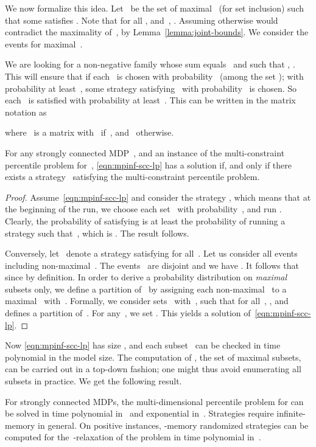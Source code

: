 \documentclass{llncs}
\begin{document}
We now formalize this idea. Let~ be the set of maximal~ (for set inclusion) such that some 
satisfies . 
Note that for all , and~,
. Assuming otherwise would contradict the maximality of~, by Lemma~\ref{lemma:joint-bounds}.
We consider the events 
for maximal~.

We are looking for a non-negative family 
 whose sum equals~ and such that , .
This will ensure that if each~ is chosen with probability~ (among the set ); with probability at least~,
some strategy satisfying~ with probability~ is chosen. So each~ is satisfied with probability at least~.
This can be written in the matrix notation as

where~ is a  matrix with~ if~, and~ otherwise.

\begin{lemma}
  For any strongly connected MDP~,
  and an instance  of the multi-constraint percentile problem for~,
  \eqref{eqn:mpinf-scc-lp} has a solution if, and only if there exists a strategy~ satisfying
  the multi-constraint percentile problem.
\end{lemma}

\begin{proof}
  Assume~\eqref{eqn:mpinf-scc-lp} and consider the strategy , which means that
  at the beginning of the run, we choose each set~ with probability~, and run
  . Clearly, the probability of satisfying  is at least the probability of running
  a strategy  such that~, which is .
  The result follows.

  Conversely, let~ denote a strategy satisfying  for all~.
  Let us consider all events~ including non-maximal~.
  The events~ are disjoint and we have .
  It follows that 
  since  by definition.
  In order to derive a probability distribution on \emph{maximal} subsets only, 
  we define a partition of~ by assigning each non-maximal~ to a maximal~
  with~. Formally,
  we consider sets~ with~, 
   such that for all~, , and  defines a partition of~.
  For any~, we set
  .
  This yields a solution of~\eqref{eqn:mpinf-scc-lp}.
\end{proof}

Now \eqref{eqn:mpinf-scc-lp} has size , and each subset~ can be checked in time polynomial in the model size.
The computation of , the set of maximal subsets, can be carried out in a top-down fashion;
one might thus avoid enumerating all subsets in practice.
We get the following result.

\begin{lemma}
  For strongly connected MDPs, the multi-dimensional percentile problem for   can be solved in time polynomial 
  in~ and exponential in~. Strategies require infinite-memory in general.
  On positive instances, -memory randomized strategies can be computed for the~-relaxation of the problem
  in time polynomial in~.
\end{lemma}
\end{document}
